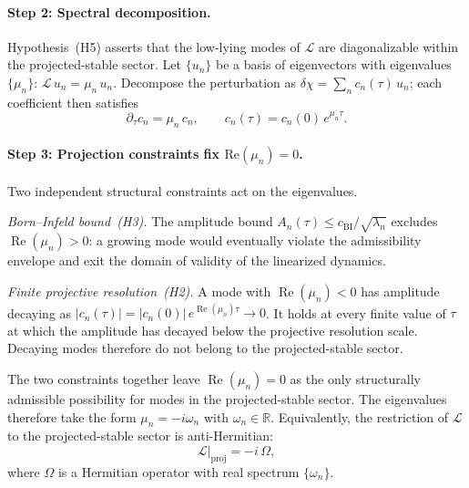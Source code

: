     \paragraph{Step 2: Spectral decomposition.}

      Hypothesis~(H5) asserts that the low-lying modes of $\mathcal{L}$ are
      diagonalizable within the projected-stable sector.
      Let $\{u_n\}$ be a basis of eigenvectors with eigenvalues $\{\mu_n\}$:
      $\mathcal{L}\,u_n = \mu_n\,u_n$.
      Decompose the perturbation as $\delta\chi = \sum_n c_n(\tau)\,u_n$; each
      coefficient then satisfies
      \[
        \partial_\tau c_n = \mu_n\,c_n,
        \qquad c_n(\tau) = c_n(0)\,e^{\mu_n\tau}.
      \]

    \paragraph{Step 3: Projection constraints fix $\mathrm{Re}(\mu_n) = 0$.}

      Two independent structural constraints act on the eigenvalues.

      \emph{Born--Infeld bound~(H3).}
      The amplitude bound $A_n(\tau) \leq c_{\mathrm{BI}}/\sqrt{\lambda_n}$ excludes
      $\operatorname{Re}(\mu_n) > 0$: a growing mode would eventually violate the
      admissibility envelope and exit the domain of validity of the linearized dynamics.

      \emph{Finite projective resolution~(H2).}
      A mode with $\operatorname{Re}(\mu_n) < 0$ has amplitude decaying as
      $|c_n(\tau)| = |c_n(0)|\,e^{\operatorname{Re}(\mu_n)\tau} \to 0$.
      It holds at every finite value of $\tau$ at which the amplitude has decayed below the
      projective resolution scale.
      Decaying modes therefore do not belong to the projected-stable sector.

      The two constraints together leave $\operatorname{Re}(\mu_n) = 0$ as the only structurally
      admissible possibility for modes in the projected-stable sector.
      The eigenvalues therefore take the form $\mu_n = -i\omega_n$ with $\omega_n \in \mathbb{R}$.
      Equivalently, the restriction of $\mathcal{L}$ to the projected-stable sector is anti-Hermitian:
      \[
        \mathcal{L}\big|_{\mathrm{proj}} = -i\,\Omega,
      \]
      where $\Omega$ is a Hermitian operator with real spectrum $\{\omega_n\}$.

